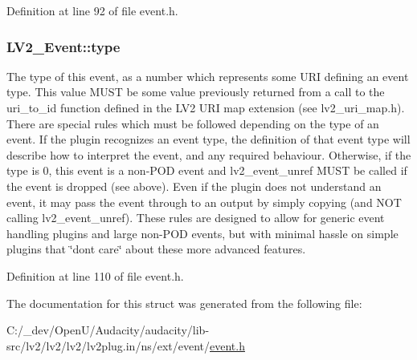 Definition at line 92 of file event.\+h.

\subsubsection[{\texorpdfstring{type}{type}}]{ L\+V2\+\_\+\+Event\+::type}\hypertarget{struct_l_v2___event_a65c8311c5c37ada6b44730e259131f37}{}\label{struct_l_v2___event_a65c8311c5c37ada6b44730e259131f37}
The type of this event, as a number which represents some U\+RI defining an event type. This value M\+U\+ST be some value previously returned from a call to the uri\+\_\+to\+\_\+id function defined in the L\+V2 U\+RI map extension (see lv2\+\_\+uri\+\_\+map.\+h). There are special rules which must be followed depending on the type of an event. If the plugin recognizes an event type, the definition of that event type will describe how to interpret the event, and any required behaviour. Otherwise, if the type is 0, this event is a non-\/\+P\+OD event and lv2\+\_\+event\+\_\+unref M\+U\+ST be called if the event is \textquotesingle{}dropped\textquotesingle{} (see above). Even if the plugin does not understand an event, it may pass the event through to an output by simply copying (and N\+OT calling lv2\+\_\+event\+\_\+unref). These rules are designed to allow for generic event handling plugins and large non-\/\+P\+OD events, but with minimal hassle on simple plugins that \char`\"{}don\textquotesingle{}t care\char`\"{} about these more advanced features. 

Definition at line 110 of file event.\+h.



The documentation for this struct was generated from the following file\+:\begin{DoxyCompactItemize}
\item 
C\+:/\+\_\+dev/\+Open\+U/\+Audacity/audacity/lib-\/src/lv2/lv2/lv2/lv2plug.\+in/ns/ext/event/\hyperlink{event_8h}{event.\+h}\end{DoxyCompactItemize}
